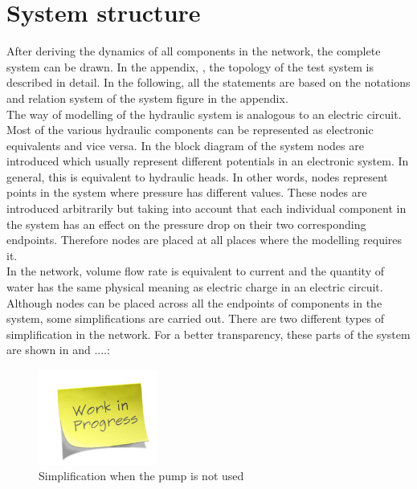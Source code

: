 \section{System structure}  
\label{SystemModel}

After deriving the dynamics of all components in the network, the complete system can be drawn. In the appendix, , the topology of the test system is described in detail. In the following, all the statements are based on the notations and relation system of the system figure in the appendix. 
\\
The way of modelling of the hydraulic system is analogous to an electric circuit. Most of the various hydraulic components can be represented as electronic equivalents and vice versa. In the block diagram of the system nodes are introduced which usually represent different potentials in an electronic system. In general, this is equivalent to hydraulic heads. In other words, nodes represent points in the system where pressure has different values. These nodes are introduced arbitrarily but taking into account that each individual component in the system has an effect on the pressure drop on their two corresponding endpoints. Therefore nodes are placed at all places where the modelling requires it. 
\\
In the network, volume flow rate is equivalent to current and the quantity of water has the same physical meaning as electric charge in an electric circuit. 
\\ 
Although nodes can be placed across all the endpoints of components in the system, some simplifications are carried out. There are two different types of simplification in the network. For a better transparency, these parts of the system are shown in  and ....: 

\begin{figure}[H]
\centering
\includegraphics[width=0.35\textwidth]{report/pictures/missingfigure}
\caption{Simplification when the pump is not used}
\label{fig:subsys_1}
\end{figure}